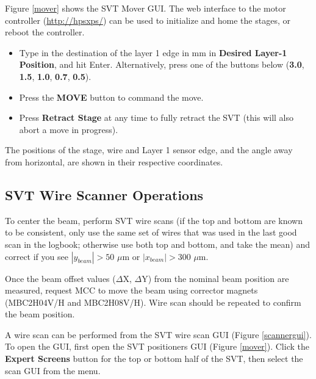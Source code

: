 \documentclass[12pt]{report}
\begin{document}
Figure \ref{mover} shows the SVT Mover GUI.
The web interface to the motor controller (\url{http://hpsxps/}) can be used to initialize and home the stages, or reboot the controller.

\begin{itemize}
\item
Type in the destination of the layer 1 edge in mm in \textbf{Desired Layer-1 Position}, and hit Enter. Alternatively, press one of the buttons below (\textbf{3.0}, \textbf{1.5}, \textbf{1.0}, \textbf{0.7}, \textbf{0.5}).
\item Press the \textbf{MOVE} button to command the move.
\item Press \textbf{Retract Stage} at any time to fully retract the SVT (this will also abort a move in progress).
\end{itemize}

The positions of the stage, wire and Layer 1 sensor edge, and the angle away from horizontal, are shown in their respective coordinates.

\subsection{SVT Wire Scanner Operations}
\label{sec:wirescan}

To center the beam, perform SVT wire scans (if the top and bottom are known to be consistent, only use the same set of wires that was used in the last good scan in the logbook; otherwise use both top and bottom, and take the mean) and correct if you see $|y_{beam}| > 50$ $\mu$m or $|x_{beam}| > 300$ $\mu$m.

Once the beam offset values ($\Delta$X, $\Delta$Y) from the nominal beam position are measured, request MCC to move the beam using corrector magnets (MBC2H04V/H and MBC2H08V/H). Wire scan should be repeated to confirm the beam position.

A wire scan can be performed from the SVT wire scan GUI (Figure \ref{scannergui}). To open the GUI, first open the SVT positioners GUI (Figure \ref{mover}). Click the \textbf{Expert Screens} button for the top or bottom half of the SVT, then select the scan GUI from the menu.
\end{document}
